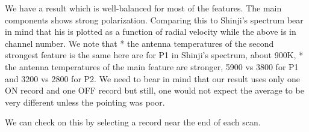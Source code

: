 \documentclass[letterpaper,10pt,english]{/usr/share/sphinx/texinputs/sphinxhowto}
\begin{document}
        
    
We have a result which is well-balanced for most of the features. The
main components shows strong polarization. Comparing this to Shinji's
spectrum bear in mind that his is plotted as a function of radial
velocity while the above is in channel number. We note that * the
antenna temperatures of the second strongest feature is the same here
are for P1 in Shinji's spectrum, about 900K, * the antenna temperatures
of the main feature are stronger, 5900 vs 3800 for P1 and 3200 vs 2800
for P2. We need to bear in mind that our result uses only one ON record
and one OFF record but still, one would not expect the average to be
very different unless the pointing was poor.

We can check on this by selecting a record near the end of each scan.

\end{document}
